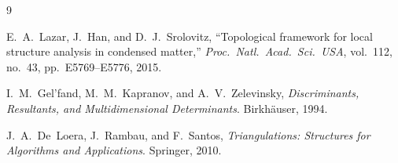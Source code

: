 \documentclass[11pt]{article}
\theoremstyle{definition}
\begin{document}
\begin{thebibliography}{9}

E.~A.~Lazar, J.~Han, and D.~J.~Srolovitz,
``Topological framework for local structure analysis in condensed
matter,'' \emph{Proc.\ Natl.\ Acad.\ Sci.\ USA}, vol.~112, no.~43,
pp.~E5769--E5776, 2015.

I.~M.~Gel'fand, M.~M.~Kapranov, and A.~V.~Zelevinsky,
\emph{Discriminants, Resultants, and Multidimensional Determinants}.
Birkh\"auser, 1994.

J.~A.~De~Loera, J.~Rambau, and F.~Santos,
\emph{Triangulations: Structures for Algorithms and Applications}.
Springer, 2010.

\end{thebibliography}
\end{document}
